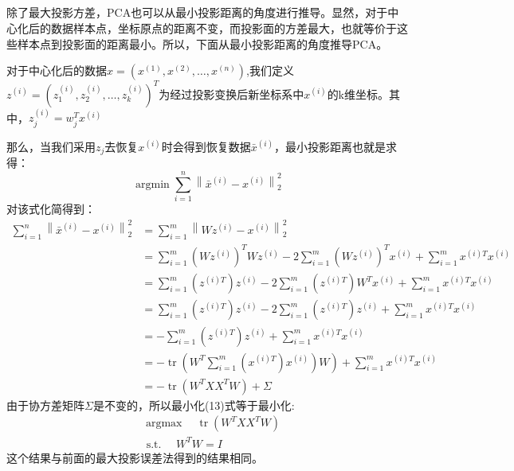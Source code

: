\documentclass[lang=cn,a4paper,cite=authoryear]{elegantpaper}
\begin{document}
\subsection*{}
除了最大投影方差，PCA也可以从最小投影距离的角度进行推导。显然，对于中心化后的数据样本点，坐标原点的距离不变，而投影面的方差最大，也就等价于这些样本点到投影面的距离最小。所以，下面从最小投影距离的角度推导PCA。
\par 对于中心化后的数据$x=\left(x^{(1)}, x^{(2)}, \ldots, x^{(n)}\right)$,我们定义$z^{(i)}=\left(z_{1}^{(i)}, z_{2}^{(i)}, \ldots, z_{k}^{(i)}\right)^{T}$为经过投影变换后新坐标系中$x^{(i)}$的k维坐标。其中，$z_{j}^{(i)}=w_{j}^{T} x^{(i)}$
\par 那么，当我们采用$z_{j}$去恢复$x^{(i)}$时会得到恢复数据$\bar{x}^{(i)}$，最小投影距离也就是求得：
\begin{equation}
   \operatorname{argmin} \sum_{i=1}^{n}\left\|\bar{x}^{(i)}-x^{(i)}\right\|_{2}^{2}
\end{equation}
对该式化简得到：
\begin{equation}
	\begin{aligned}
		\sum_{i=1}^{n}\left\|\bar{x}^{(i)}-x^{(i)}\right\|_{2}^{2} &=\sum_{i=1}^{m}\left\|W z^{(i)}-x^{(i)}\right\|_{2}^{2} \\
		&=\sum_{i=1}^{m}\left(W z^{(i)}\right)^{T} W z^{(i)}-2 \sum_{i=1}^{m}\left(W z^{(i)}\right)^{T} x^{(i)}+\sum_{i=1}^{m} x^{(i) T} x^{(i)} \\
		&=\sum_{i=1}^{m}\left(z^{(i) T}\right) z^{(i)}-2 \sum_{i=1}^{m}\left(z^{(i) T}\right) W^{T} x^{(i)}+\sum_{i=1}^{m} x^{(i) T} x^{(i)} \\
		&=\sum_{i=1}^{m}\left(z^{(i) T}\right) z^{(i)}-2 \sum_{i=1}^{m}\left(z^{(i) T}\right) z^{(i)}+\sum_{i=1}^{m} x^{(i) T} x^{(i)} \\
		&=-\sum_{i=1}^{m}\left(z^{(i) T}\right) z^{(i)}+\sum_{i=1}^{m} x^{(i) T} x^{(i)} \\
		&\left.=-\operatorname{tr}\left(W^{T} \sum_{i=1}^{m}\left(x^{(i) T}\right) x^{(i)}\right) W\right)+\sum_{i=1}^{m} x^{(i) T} x^{(i)} \\
		&=-\operatorname{tr}\left(W^{T} X X^{T} W\right)+\Sigma
	\end{aligned}
\end{equation}
由于协方差矩阵$\Sigma$是不变的，所以最小化(13)式等于最小化:
\begin{equation}
	\begin{aligned}
		&\operatorname{argmax} \quad \operatorname{tr}\left(W^{T} X X^{T} W\right) \\
		&\text { s.t. } \quad W^{T} W=I
	\end{aligned}
\end{equation}
这个结果与前面的最大投影误差法得到的结果相同。
\end{document}
